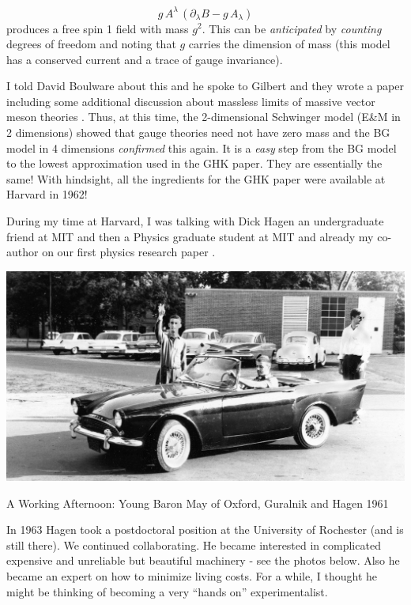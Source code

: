 \documentclass[letterpaper,twoside,preprintnumbers,slac_one]{revtex4}
\newcommand{\pa}{\partial}
\begin{document}
\begin{equation*}
  g\, A^{\lambda}\, \left(\pa_{\lambda}B - g\,A_{\lambda}\right)
\end{equation*}
produces a free spin 1 field with mass $g^2$. This can be
\emph{anticipated} by \emph{counting} degrees of freedom and noting
that $g$ carries the dimension of mass (this model has a conserved
current and a trace of gauge invariance).

I told David Boulware about this and he spoke to Gilbert and they
wrote a paper including some additional discussion about massless limits of massive vector
meson theories \cite{bg;1962}. Thus, at this time,
the 2-dimensional Schwinger model (E\&M in 2 dimensions) showed that
gauge theories need not have zero mass and the BG model in 4
dimensions \emph{confirmed} this again. It is a \emph{easy} step from
the BG model to the lowest approximation used in the GHK paper. They
are essentially the same! With hindsight, all the ingredients for the
GHK paper were available at Harvard in 1962!

During my time at Harvard, I was talking with Dick Hagen an
undergraduate friend at MIT and then a Physics graduate student at MIT
and already my co-author on our first physics research paper \cite{gh1;1963}.

\begin{center}
  \includegraphics[scale=0.27]{bgh.jpg}

  A Working Afternoon: Young Baron May of Oxford, Guralnik and Hagen 1961
\end{center}

In 1963 Hagen took a postdoctoral position at the University of
Rochester (and is still there). We continued collaborating. He became
interested in complicated expensive and unreliable but beautiful
machinery - see the photos below. Also he became an expert on how to minimize living costs. For a while, I thought he might be
thinking of becoming a very ``hands on'' experimentalist.
\end{document}
